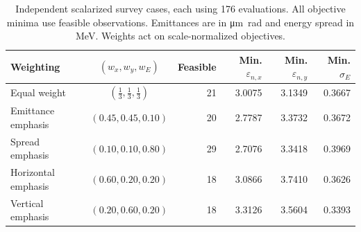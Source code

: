 \begin{table}[htbp]\centering\small
\caption{Independent scalarized survey cases, each using 176 evaluations. All objective
minima use feasible observations. Emittances are in \si{\micro\metre\radian} and
energy spread in \si{\mega\electronvolt}. Weights act on scale-normalized objectives.}
\label{tab:phase1_cases}
\begin{tabular}{lcrrrr}\toprule
Weighting & $(w_x,w_y,w_E)$ & Feasible & Min. $\varepsilon_{n,x}$ & Min. $\varepsilon_{n,y}$ & Min. $\sigma_E$ \\\midrule
Equal weight & $(\frac13,\frac13,\frac13)$ & 21 & 3.0075 & 3.1349 & 0.3667 \\
Emittance emphasis & $(0.45,0.45,0.10)$ & 20 & 2.7787 & 3.3732 & 0.3672 \\
Spread emphasis & $(0.10,0.10,0.80)$ & 29 & 2.7076 & 3.3418 & 0.3969 \\
Horizontal emphasis & $(0.60,0.20,0.20)$ & 18 & 3.0866 & 3.7410 & 0.3626 \\
Vertical emphasis & $(0.20,0.60,0.20)$ & 18 & 3.3126 & 3.5604 & 0.3393 \\
\bottomrule\end{tabular}\end{table}
